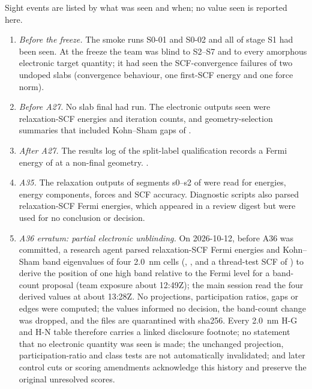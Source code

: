 Sight events are listed by what was seen and when; no value seen is reported here.
\begin{enumerate}
\item \emph{Before the freeze.} The smoke runs S0-01 and S0-02 and all of stage S1 had been seen. At the freeze the
team was blind to S2--S7 and to every amorphous electronic target quantity; it had seen the SCF-convergence failures of
two undoped slabs (convergence behaviour, one first-SCF energy and one force norm). %
\item \emph{Before A27.} No slab final had run. The electronic outputs seen were relaxation-SCF energies and iteration
counts, and geometry-selection summaries that included Kohn--Sham gaps of . %
\item \emph{After A27.} The results log of the split-label qualification records a Fermi energy of
 at a non-final geometry. . %
\item \emph{A35.} The relaxation outputs of segments s0--s2 of  were read for energies, energy
components, forces and SCF accuracy. Diagnostic scripts also parsed relaxation-SCF Fermi energies, which appeared in
a review digest but were used for no conclusion or decision. %
\item \emph{A36 erratum: partial electronic unblinding.} On 2026-10-12, before A36 was committed, a research agent
parsed relaxation-SCF Fermi energies and Kohn--Sham band eigenvalues of four \SI{2.0}{nm} cells
(, ,  and a thread-test SCF of
) to derive the position of one high band relative to the Fermi level for a band-count proposal
(team exposure about 12:49Z); the main session read the four derived values at about 13:28Z. No projections,
participation ratios, gaps or edges were computed; the values informed no decision, the band-count change was
dropped, and the files are quarantined with sha256. Every \SI{2.0}{nm} H-G and H-N table therefore carries a linked
disclosure footnote; no statement that no electronic quantity was seen is made; the unchanged projection,
participation-ratio and class tests are not automatically invalidated; and later control cuts or scoring amendments
acknowledge this history and preserve the original unresolved scores. %

\end{enumerate}
